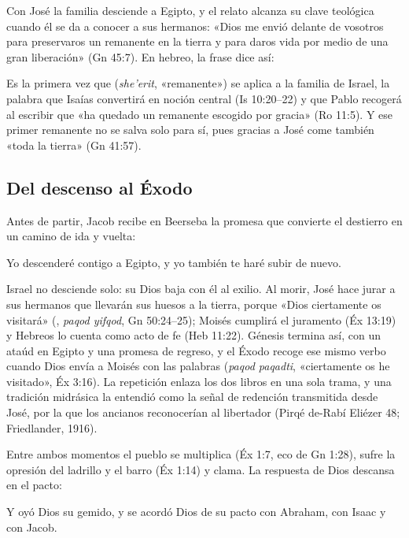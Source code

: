 Con José la familia desciende a Egipto, y el relato alcanza su clave teológica cuando él se da a conocer a sus hermanos: «Dios me envió delante de vosotros para preservaros un remanente en la tierra y para daros vida por medio de una gran liberación» (Gn 45:7). En hebreo, la frase dice así:


Es la primera vez que  (\emph{she'erit}, «remanente») se aplica a la familia de Israel, la palabra que Isaías convertirá en noción central (Is 10:20–22) y que Pablo recogerá al escribir que «ha quedado un remanente escogido por gracia» (Ro 11:5). Y ese primer remanente no se salva solo para sí, pues gracias a José come también «toda la tierra» (Gn 41:57).

\subsection{Del descenso al Éxodo}
Antes de partir, Jacob recibe en Beerseba la promesa que convierte el destierro en un camino de ida y vuelta:

\begin{cita}Yo descenderé contigo a Egipto, y yo también te haré subir de nuevo.\end{cita}

Israel no desciende solo: su Dios baja con él al exilio. Al morir, José hace jurar a sus hermanos que llevarán sus huesos a la tierra, porque «Dios ciertamente os visitará» (, \emph{paqod yifqod}, Gn 50:24–25); Moisés cumplirá el juramento (Éx 13:19) y Hebreos lo cuenta como acto de fe (Heb 11:22). Génesis termina así, con un ataúd en Egipto y una promesa de regreso, y el Éxodo recoge ese mismo verbo cuando Dios envía a Moisés con las palabras  (\emph{paqod paqadti}, «ciertamente os he visitado», Éx 3:16). La repetición enlaza los dos libros en una sola trama, y una tradición midrásica la entendió como la señal de redención transmitida desde José, por la que los ancianos reconocerían al libertador (Pirqé de-Rabí Eliézer 48; Friedlander, 1916).

Entre ambos momentos el pueblo se multiplica (Éx 1:7, eco de Gn 1:28), sufre la opresión del ladrillo y el barro (Éx 1:14) y clama. La respuesta de Dios descansa en el pacto:

\begin{cita}Y oyó Dios su gemido, y se acordó Dios de su pacto con Abraham, con Isaac y con Jacob.\end{cita}

